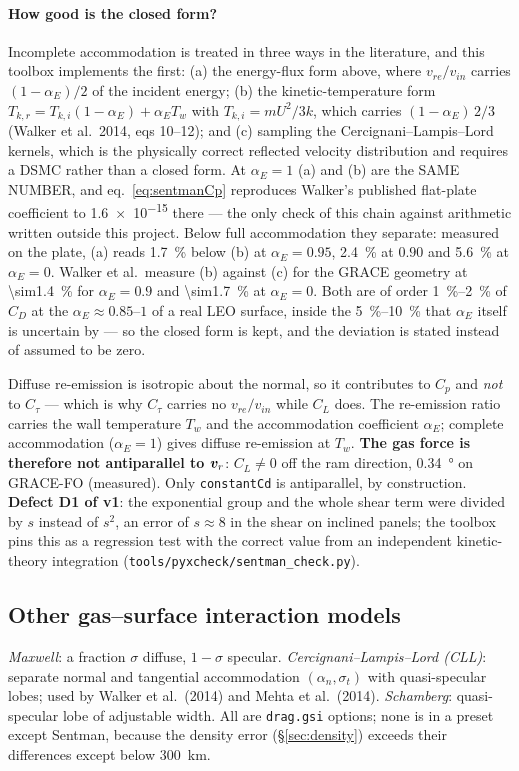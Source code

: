 \paragraph{How good is the closed form?} Incomplete accommodation is treated in three ways in the
literature, and this toolbox implements the first: (a) the energy-flux form above, where
$v_{re}/v_{in}$ carries $(1-\alpha_E)/2$ of the incident energy; (b) the kinetic-temperature form
$T_{k,r}=T_{k,i}(1-\alpha_E)+\alpha_E T_w$ with $T_{k,i}=mU^2/3k$, which carries $(1-\alpha_E)\,2/3$
(Walker et al.\ 2014, eqs 10--12); and (c) sampling the Cercignani--Lampis--Lord kernels, which is the
physically correct reflected velocity distribution and requires a DSMC rather than a closed form.
At $\alpha_E=1$ (a) and (b) are the SAME NUMBER, and eq.~\eqref{eq:sentmanCp} reproduces Walker's
published flat-plate coefficient to \num{1.6e-15} there --- the only check of this chain against
arithmetic written outside this project. Below full accommodation they separate: measured on the
plate, (a) reads \SI{1.7}{\percent} below (b) at $\alpha_E=0.95$, \SI{2.4}{\percent} at $0.90$ and
\SI{5.6}{\percent} at $\alpha_E=0$. Walker et al.\ measure (b) against (c) for the GRACE geometry at
\SI{\sim1.4}{\percent} for $\alpha_E=0.9$ and \SI{\sim1.7}{\percent} at $\alpha_E=0$. Both are of order
\SIrange{1}{2}{\percent} of $C_D$ at the $\alpha_E\approx0.85$--$1$ of a real LEO surface, inside the
\SIrange{5}{10}{\percent} that $\alpha_E$ itself is uncertain by --- so the closed form is kept, and
the deviation is stated instead of assumed to be zero.

Diffuse re-emission is isotropic about the normal, so it contributes to $C_p$ and \emph{not} to $C_\tau$ --- which is why $C_\tau$ carries no $v_{re}/v_{in}$ while $C_L$ does. The re-emission ratio carries the wall temperature $T_w$ and the accommodation coefficient $\alpha_E$; complete accommodation ($\alpha_E=1$) gives diffuse re-emission at $T_w$. \textbf{The gas force is therefore not antiparallel to $\bm{v}_r$}: $C_L\ne0$ off the ram direction, \SI{0.34}{\degree} on GRACE-FO (measured). Only \texttt{constantCd} is antiparallel, by construction. \textbf{Defect D1 of v1}: the exponential group and the whole shear term were divided by $s$ instead of $s^2$, an error of $s\approx8$ in the shear on inclined panels; the toolbox pins this as a regression test with the correct value from an independent kinetic-theory integration (\texttt{tools/pyxcheck/sentman\_check.py}).

\subsection{Other gas--surface interaction models}
\emph{Maxwell}: a fraction $\sigma$ diffuse, $1-\sigma$ specular. \emph{Cercignani--Lampis--Lord (CLL)}: separate normal and tangential accommodation $(\alpha_n,\sigma_t)$ with quasi-specular lobes; used by Walker et al.\ (2014) and Mehta et al.\ (2014). \emph{Schamberg}: quasi-specular lobe of adjustable width. All are \texttt{drag.gsi} options; none is in a preset except Sentman, because the density error (\S\ref{sec:density}) exceeds their differences except below \SI{300}{\kilo\metre}.

